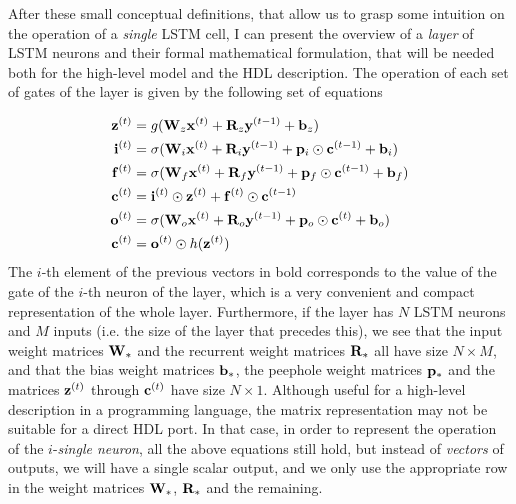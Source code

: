 After these small conceptual definitions, that allow us to grasp some intuition on the operation of a \textit{single} LSTM cell, I can present the overview of a \textit{layer} of LSTM neurons and their formal mathematical formulation, that will be needed both for the high-level model and the HDL description. The operation of each set of gates of the layer is given by the following set of equations

\begin{align}\label{eq:equationsLSTM}
    \mathbf{z}^{(t)} & = g(\mathbf{W}_z \mathbf{x}^{(t)} + \mathbf{R}_z \mathbf{y}^{(t-1)} + \mathbf{b}_z) \\
    \mathbf{i}^{(t)} & = \sigma(\mathbf{W}_i \mathbf{x}^{(t)} + \mathbf{R}_i \mathbf{y}^{(t-1)} + \mathbf{p}_i \odot \mathbf{c}^{(t-1)} + \mathbf{b}_i) \\
    \mathbf{f}^{(t)} & = \sigma(\mathbf{W}_f \mathbf{x}^{(t)} + \mathbf{R}_f \mathbf{y}^{(t-1)} + \mathbf{p}_f \odot \mathbf{c}^{(t-1)} + \mathbf{b}_f) \\
    \mathbf{c}^{(t)} & = \mathbf{i}^{(t)} \odot \mathbf{z}^{(t)} + \mathbf{f}^{(t)} \odot \mathbf{c}^{(t-1)} \\
    \mathbf{o}^{(t)} & = \sigma(\mathbf{W}_o \mathbf{x}^{(t)} + \mathbf{R}_o \mathbf{y}^{(t-1)} + \mathbf{p}_o \odot \mathbf{c}^{(t)} + \mathbf{b}_o) \\
    \mathbf{c}^{(t)} & = \mathbf{o}^{(t)} \odot h(\mathbf{z}^{(t)}) 
\end{align}
The $i$-th element of the previous vectors in bold corresponds to the value of the gate of the $i$-th neuron of the layer, which is a very convenient and compact representation of the whole layer. Furthermore, if the layer has $N$ LSTM neurons and $M$ inputs (i.e. the size of the layer that precedes this), we see that the input weight matrices $\mathbf{W}_*$ and the  recurrent weight matrices $\mathbf{R}_*$ all have size $N \times M$, and that the bias weight matrices $\mathbf{b}_*$, the peephole weight matrices $\mathbf{p}_*$ and the matrices $\mathbf{z}^{(t)}$ through $\mathbf{c}^{(t)}$ have size $N \times 1$. Although useful for a high-level description in a programming language, the matrix representation  may not be suitable for a direct HDL port. In that case, in order to represent the operation of the $i$-\textit{single neuron}, all the above equations still hold, but instead of \textit{vectors} of outputs, we will have a single scalar output, and we only use the appropriate row in the weight matrices $\mathbf{W}_{*}$, $\mathbf{R}_{*}$ and the remaining.

